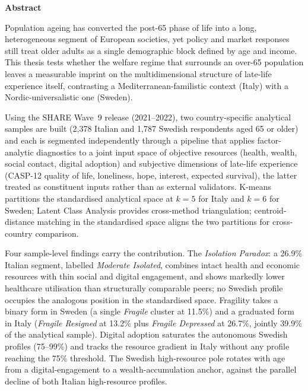
\thispagestyle{plain}
\begin{center}
  {\Large\bfseries Abstract}
\end{center}
\vspace{0.25cm}

\noindent Population ageing has converted the post-65 phase of life into a long, heterogeneous segment of European societies, yet policy and market responses still treat older adults as a single demographic block defined by age and income. This thesis tests whether the welfare regime that surrounds an over-65 population leaves a measurable imprint on the multidimensional structure of late-life experience itself, contrasting a Mediterranean-familistic context (Italy) with a Nordic-universalistic one (Sweden).

\vspace{0.15cm}

\noindent Using the SHARE Wave~9 release (2021--2022), two country-specific analytical samples are built (2{,}378 Italian and 1{,}787 Swedish respondents aged 65 or older) and each is segmented independently through a pipeline that applies factor-analytic diagnostics to a joint input space of objective resources (health, wealth, social contact, digital adoption) and subjective dimensions of late-life experience (CASP-12 quality of life, loneliness, hope, interest, expected survival), the latter treated as constituent inputs rather than as external validators. K-means partitions the standardised analytical space at $k = 5$ for Italy and $k = 6$ for Sweden; Latent Class Analysis provides cross-method triangulation; centroid-distance matching in the standardised space aligns the two partitions for cross-country comparison.

\vspace{0.15cm}

\noindent Four sample-level findings carry the contribution. The \emph{Isolation Paradox}: a 26.9\% Italian segment, labelled \emph{Moderate Isolated}, combines intact health and economic resources with thin social and digital engagement, and shows markedly lower healthcare utilisation than structurally comparable peers; no Swedish profile occupies the analogous position in the standardised space. Fragility takes a binary form in Sweden (a single \emph{Fragile} cluster at 11.5\%) and a graduated form in Italy (\emph{Fragile Resigned} at 13.2\% plus \emph{Fragile Depressed} at 26.7\%, jointly 39.9\% of the analytical sample). Digital adoption saturates the autonomous Swedish profiles (75--99\%) and tracks the resource gradient in Italy without any profile reaching the 75\% threshold. The Swedish high-resource pole rotates with age from a digital-engagement to a wealth-accumulation anchor, against the parallel decline of both Italian high-resource profiles.

